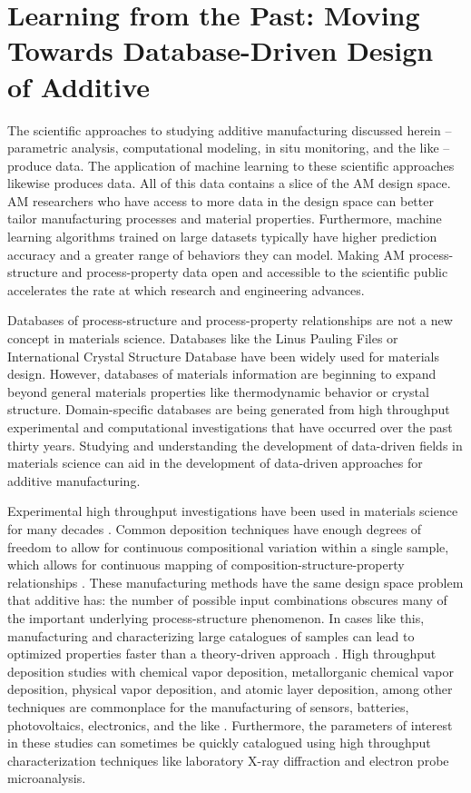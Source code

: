 \section{Learning from the Past: Moving Towards Database-Driven Design of Additive}
The scientific approaches to studying additive manufacturing discussed herein -- parametric analysis, computational modeling, in situ monitoring, and the like -- produce data. The application of machine learning to these scientific approaches likewise produces data. All of this data contains a slice of the AM design space. AM researchers who have access to more data in the design space can better tailor manufacturing processes and material properties. Furthermore, machine learning algorithms trained on large datasets typically have higher prediction accuracy and a greater range of behaviors they can model. Making AM process-structure and process-property data open and accessible to the scientific public accelerates the rate at which research and engineering advances.

Databases of process-structure and process-property relationships are not a new concept in materials science. Databases like the Linus Pauling Files or International Crystal Structure Database have been widely used for materials design. However, databases of materials information are beginning to expand beyond general materials properties like thermodynamic behavior or crystal structure. Domain-specific databases are being generated from high throughput experimental and computational investigations that have occurred over the past thirty years. Studying and understanding the development of data-driven fields in materials science can aid in the development of data-driven approaches for additive manufacturing. 

Experimental high throughput investigations have been used in materials science for many decades \cite{Xiang1995}. Common deposition techniques have enough degrees of freedom to allow for continuous compositional variation within a single sample, which allows for continuous mapping of composition-structure-property relationships \cite{Long2007, Long2009, Kusne2015a}. These manufacturing methods have the same design space problem that additive has: the number of possible input combinations obscures many of the important underlying process-structure phenomenon. In cases like this, manufacturing and characterizing large catalogues of samples can lead to optimized properties faster than a theory-driven approach \cite{Ceder1998, Pilania2013}. High throughput deposition studies with chemical vapor deposition, metallorganic chemical vapor deposition, physical vapor deposition, and atomic layer deposition, among other techniques are commonplace for the manufacturing of sensors, batteries, photovoltaics, electronics, and the like \cite{Hampden-Smith1995, Gilmer1998, Mercey1999, Mitzi2001}. Furthermore, the parameters of interest in these studies can sometimes be quickly catalogued using high throughput characterization techniques like laboratory X-ray diffraction and electron probe microanalysis. 


